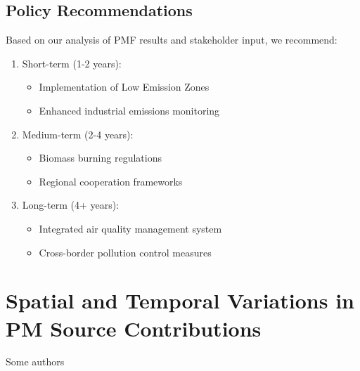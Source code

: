 \documentclass[
  letterpaper,
  oneside,
  openany]{MastersDoctoralThesis}
\providecommand{\tightlist}{%
  \setlength{\itemsep}{0pt}\setlength{\parskip}{0pt}}\usepackage{longtable,booktabs,array}
\begin{document}
\section{Policy Recommendations}\label{policy-recommendations}

Based on our analysis of PMF results and stakeholder input, we
recommend:

\begin{enumerate}
\def\labelenumi{\arabic{enumi}.}
\tightlist
\item
  Short-term (1-2 years):

  \begin{itemize}
  \tightlist
  \item
    Implementation of Low Emission Zones
  \item
    Enhanced industrial emissions monitoring
  \end{itemize}
\item
  Medium-term (2-4 years):

  \begin{itemize}
  \tightlist
  \item
    Biomass burning regulations
  \item
    Regional cooperation frameworks
  \end{itemize}
\item
  Long-term (4+ years):

  \begin{itemize}
  \tightlist
  \item
    Integrated air quality management system
  \item
    Cross-border pollution control measures
  \end{itemize}
\end{enumerate}


\chapter{Spatial and Temporal Variations in PM Source
Contributions}\label{sec-ch4}

\begin{center}
Some authors

\end{center}
\end{document}
